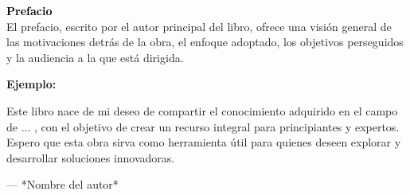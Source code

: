 \thispagestyle{empty}
\vspace*{2cm}
\textcolor{black}{\Huge \textbf{Prefacio}} \\[0.7cm] %
El prefacio, escrito por el autor principal del libro, ofrece una visión general de las motivaciones
detrás de la obra, el enfoque adoptado, los objetivos perseguidos y la audiencia a la que está dirigida.

\vspace*{2cm}
\textbf{Ejemplo:}

Este libro nace de mi deseo de compartir el conocimiento adquirido en el campo de ... , 
con el objetivo de crear un recurso integral para principiantes y expertos. 
 Espero que esta obra sirva como herramienta útil para quienes deseen explorar y desarrollar soluciones innovadoras.
 
 \vspace*{2cm}
--- *Nombre del autor*  
\clearpage